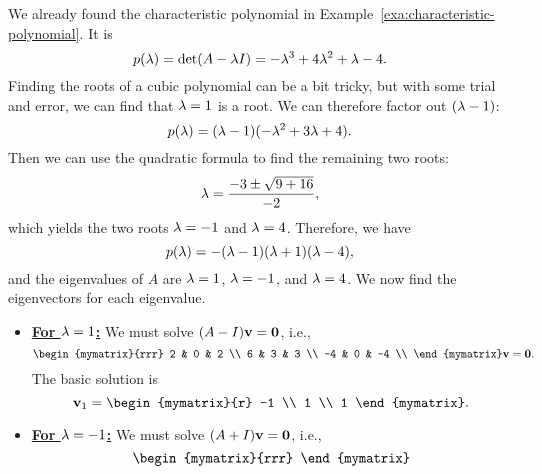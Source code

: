 \begin{solution}
  We already found the characteristic polynomial in
  Example~\ref{exa:characteristic-polynomial}. It is
  \begin{equation*}
    p(\lambda) = \det(A-\lambda I) = -\lambda^3 +4\lambda^2 +\lambda - 4.
  \end{equation*}
  Finding the roots of a cubic polynomial can be a bit tricky, but
  with some trial and error, we can find that $\lambda=1$ is a
  root. We can therefore factor out $(\lambda-1)$:
  \begin{equation*}
    p(\lambda) = (\lambda-1)(-\lambda^2+3\lambda+4).
  \end{equation*}
  Then we can use the quadratic formula to find the remaining two
  roots:
  \begin{equation*}
    \lambda = \frac{-3\pm\sqrt{9+16}}{-2},
  \end{equation*}
  which yields the two roots $\lambda=-1$ and $\lambda=4$. Therefore,
  we have
  \begin{equation*}
    p(\lambda) = -(\lambda-1)(\lambda+1)(\lambda-4),
  \end{equation*}
  and the eigenvalues of $A$ are $\lambda=1$, $\lambda=-1$, and
  $\lambda=4$. We now find the eigenvectors for each eigenvalue.
  \begin{itemize}
  \item {\bf{\underline{For $\lambda=1$:}}} We must solve
    $(A-I)\/\mbox{\bf v}=\mbox{\bf 0}$, i.e.,
    \begin{equation*}
      \begin{mymatrix}{rrr}
        2  & 0 &  2 \\
        6  & 3 &  3 \\
        -4 & 0 & -4 \\
      \end{mymatrix}\vect{v}=\vect{0}.
    \end{equation*}
    The basic solution is
    \begin{equation*}
      \vect{v}_1 = \begin{mymatrix}{r} -1 \\ 1 \\ 1 \end{mymatrix}.
    \end{equation*}
  \item {\bf{\underline{For $\lambda=-1$:}}} We must solve
    $(A+I)\/\mbox{\bf v}=\mbox{\bf 0}$, i.e.,
    \begin{equation*}
      \begin{mymatrix}{rrr}

\end{mymatrix}
\end{equation*}
\end{itemize}
\end{solution}
